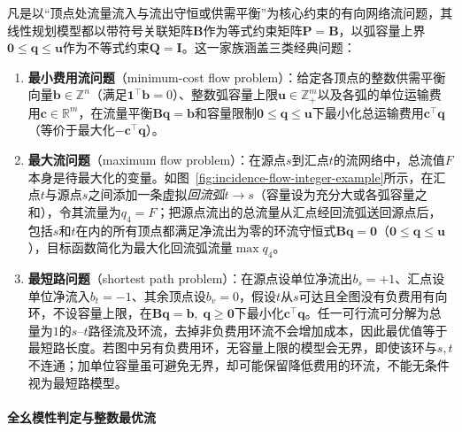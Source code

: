 凡是以“顶点处流量流入与流出守恒或供需平衡”为核心约束的有向网络流问题，其线性规划模型都以带符号关联矩阵$\bm{B}$作为等式约束矩阵$\bm{P}=\bm{B}$，以弧容量上界$\bm{0}\leq\bm{q}\leq\bm{u}$作为不等式约束$\bm{Q}=\bm{I}$。这一家族涵盖三类经典问题：
\begin{enumerate}
\item \textbf{最小费用流问题}（minimum-cost flow problem）：给定各顶点的整数供需平衡向量$\bm{b}\in\mathbb{Z}^n$（满足$\bm{1}^\top\bm{b}=0$）、整数弧容量上限$\bm{u}\in\mathbb{Z}_+^m$以及各弧的单位运输费用$\bm{c}\in\mathbb{R}^m$，在流量平衡$\bm{B}\bm{q}=\bm{b}$和容量限制$\bm{0}\leq\bm{q}\leq\bm{u}$下最小化总运输费用$\bm{c}^\top\bm{q}$（等价于最大化$-\bm{c}^\top\bm{q}$）。
\item \textbf{最大流问题}（maximum flow problem）：在源点$s$到汇点$t$的流网络中，总流值$F$本身是待最大化的变量。如图~\ref{fig:incidence-flow-integer-example}所示，在汇点$t$与源点$s$之间添加一条虚拟\emph{回流弧}$t\to s$（容量设为充分大或各弧容量之和），令其流量为$q_4=F$；把源点流出的总流量从汇点经回流弧送回源点后，包括$s$和$t$在内的所有顶点都满足净流出为零的环流守恒式$\bm{B}\bm{q}=\bm{0}$（$\bm{0}\leq\bm{q}\leq\bm{u}$），目标函数简化为最大化回流弧流量$\max q_4$。
\item \textbf{最短路问题}（shortest path problem）：在源点设单位净流出$b_s=+1$、汇点设单位净流入$b_t=-1$、其余顶点设$b_v=0$，假设$t$从$s$可达且全图没有负费用有向环，不设容量上限，在$\bm{B}\bm{q}=\bm{b},\;\bm{q}\geq\bm{0}$下最小化$\bm{c}^\top\bm{q}$。任一可行流可分解为总量为$1$的$s$--$t$路径流及环流，去掉非负费用环流不会增加成本，因此最优值等于最短路长度。若图中另有负费用环，无容量上限的模型会无界，即使该环与$s,t$不连通；加单位容量虽可避免无界，却可能保留降低费用的环流，不能无条件视为最短路模型。
\end{enumerate}

\begin{BookInlineFigure}
\centering

\caption{用虚拟回流弧将最大流写为守恒环流标准型。实线标出原网络的三条有向弧，括号内数字为弧容量；绿色虚线是从汇点$t$返回源点$s$的回流弧，其流量$q_4$等于原网络从$s$到$t$的总流值。在中转路径$s\to a\to t$（受限于弧$(a,t)$容量$1$）与直达弧$s\to t$（容量$1$）上各输送$1$个单位整数流量，在回流弧上汇成最大流值$q_4=2$。}
\label{fig:incidence-flow-integer-example}
\end{BookInlineFigure}

\paragraph{全幺模性判定与整数最优流}

